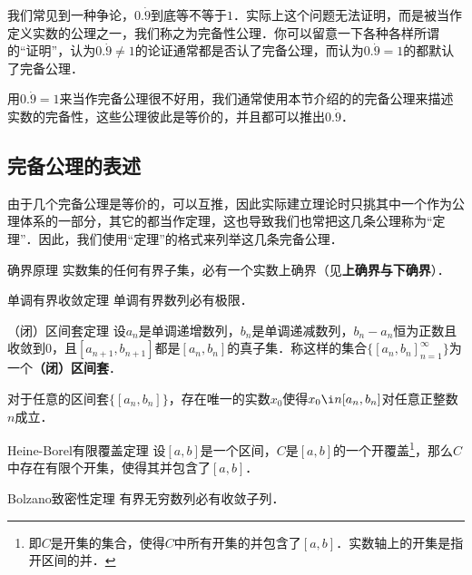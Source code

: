 



我们常见到一种争论，$0.\dot{9}$到底等不等于$1$．实际上这个问题无法证明，而是被当作定义实数的公理之一，我们称之为完备性公理．你可以留意一下各种各样所谓的“证明”，认为$0.\dot{9}\neq 1$的论证通常都是否认了完备公理，而认为$0.\dot{9}=1$的都默认了完备公理．

用$0.\dot{9}=1$来当作完备公理很不好用，我们通常使用本节介绍的的完备公理来描述实数的完备性，这些公理彼此是等价的，并且都可以推出$0.\dot{9}$．

\subsection{完备公理的表述}

由于几个完备公理是等价的，可以互推，因此实际建立理论时只挑其中一个作为公理体系的一部分，其它的都当作定理，这也导致我们也常把这几条公理称为“定理”．因此，我们使用“定理”的格式来列举这几条完备公理．

\begin{theorem}{确界原理}\label{RCompl_the1}
实数集的任何有界子集，必有一个实数上确界（见\textbf{上确界与下确界}）．
\end{theorem}

\begin{theorem}{单调有界收敛定理}\label{RCompl_the2}
单调有界数列必有极限．
\end{theorem}

\begin{theorem}{（闭）区间套定理}\label{RCompl_the3}
设$a_n$是单调递增数列，$b_n$是单调递减数列，$b_n-a_n$恒为正数且收敛到$0$，且$[a_{n+1}, b_{n+1}]$都是$[a_n, b_n]$的真子集．称这样的集合$\{[a_n, b_n]_{n=1}^\infty\}$为一个\textbf{（闭）区间套}．

对于任意的区间套$\{[a_n, b_n]\}$，存在唯一的实数$x_0$使得$x_0\i n [a_n, b_n]$对任意正整数$n$成立．
\end{theorem}

\begin{theorem}{Heine-Borel有限覆盖定理}\label{RCompl_the4}
设$[a, b]$是一个区间，$C$是$[a, b]$的一个开覆盖\footnote{即$C$是开集的集合，使得$C$中所有开集的并包含了$[a, b]$．实数轴上的开集是指开区间的并．}，那么$C$中存在有限个开集，使得其并包含了$[a, b]$．
\end{theorem}

\begin{theorem}{Bolzano致密性定理}\label{RCompl_the5}
有界无穷数列必有收敛子列．
\end{theorem}

